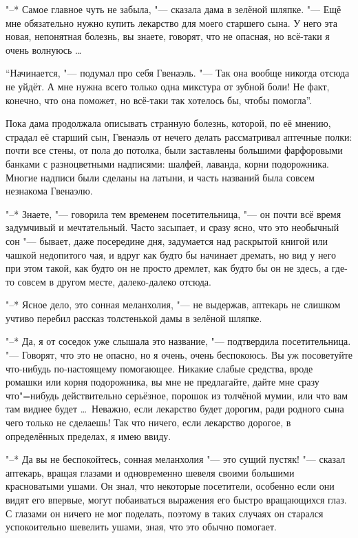 "--* Самое главное чуть не забыла, "--- сказала дама в зелёной шляпке.
"--- Ещё мне обязательно нужно купить лекарство для моего старшего сына.
У него эта новая, непонятная болезнь, вы знаете, говорят, что не опасная, но
всё-таки я очень волнуюсь \ldots

\enquote{Начинается, "--- подумал про себя Гвенаэль.
"--- Так она вообще никогда отсюда не уйдёт.
А мне нужна всего только одна микстура от зубной боли!
Не факт, конечно, что она поможет, но всё-таки так хотелось бы, чтобы помогла}.

Пока дама продолжала описывать странную болезнь, которой, по её мнению, страдал
её старший сын, Гвенаэль от нечего делать рассматривал аптечные полки: почти
все стены, от пола до потолка, были заставлены большими фарфоровыми банками с
разноцветными надписями: шалфей, лаванда, корни подорожника.
Многие надписи были сделаны на латыни, и часть названий была совсем незнакома
Гвенаэлю.

"--* Знаете, "--- говорила тем временем посетительница, "--- он почти всё время
задумчивый и мечтательный.
Часто засыпает, и сразу ясно, что это необычный сон "--- бывает, даже
посередине дня, задумается над раскрытой книгой или чашкой недопитого чая, и
вдруг как будто бы начинает дремать, но вид у него при этом такой, как будто он
не просто дремлет, как будто бы он не здесь, а где-то совсем в другом месте,
далеко-далеко отсюда.

"--* Ясное дело, это сонная меланхолия, "--- не выдержав, аптекарь не слишком
учтиво перебил рассказ толстенькой дамы в зелёной шляпке.

"--* Да, я от соседок уже слышала это название, "--- подтвердила
посетительница.
"--- Говорят, что это не опасно, но я очень, очень беспокоюсь.
Вы уж посоветуйте что-нибудь по-настоящему помогающее.
Никакие слабые средства, вроде ромашки или корня подорожника, вы мне не
предлагайте, дайте мне сразу что"=нибудь действительно серьёзное, порошок из
толчёной мумии, или что вам там виднее будет \ldots\
Неважно, если лекарство будет дорогим, ради родного сына чего только не
сделаешь!
Так что ничего, если лекарство дорогое, в определённых пределах, я имею ввиду.

"--* Да вы не беспокойтесь, сонная меланхолия "--- это сущий пустяк! "---
сказал аптекарь, вращая глазами и одновременно шевеля своими большими
красноватыми ушами.
Он знал, что некоторые посетители, особенно если они видят его впервые, могут
побаиваться выражения его быстро вращающихся глаз.
С глазами он ничего не мог поделать, поэтому в таких случаях он старался
успокоительно шевелить ушами, зная, что это обычно помогает.

